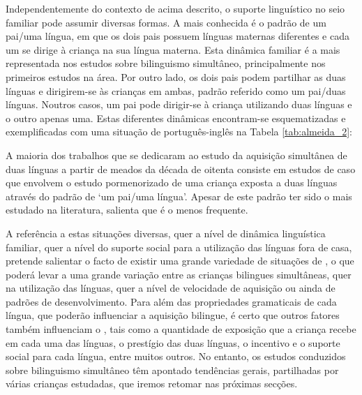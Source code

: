 \documentclass[output=paper]{LSP/langsci}
\begin{document}
Independentemente do contexto de  acima descrito, o suporte linguístico no seio familiar pode assumir diversas formas. A mais conhecida é o padrão de um pai/uma língua, em que os dois pais possuem línguas maternas diferentes e cada um se dirige à criança na sua língua materna. Esta dinâmica familiar é a mais representada nos estudos sobre bilinguismo simultâneo, principalmente nos primeiros estudos na área. Por outro lado, os dois pais podem partilhar as duas línguas e dirigirem-se às crianças em ambas, padrão referido como um pai/duas línguas. Noutros casos, um pai pode dirigir-se à criança utilizando duas línguas e o outro apenas uma. Estas diferentes dinâmicas encontram-se esquematizadas e exemplificadas com uma situação de  português-inglês na Tabela \ref{tab:almeida_2}:

\begin{table}[h]
\centering
{}
\caption{Padrões de contacto com as línguas dos pais em situação de bilinguismo}
\label{tab:almeida_2}
\end{table}

A maioria dos trabalhos que se dedicaram ao estudo da aquisição simultânea de duas línguas a partir de meados da década de oitenta consiste em estudos de caso que envolvem o estudo pormenorizado de uma criança exposta a duas línguas através do padrão de `um pai/uma língua'. Apesar de este padrão ter sido o mais estudado na literatura, \citet{dehouwer2009} salienta que é o menos frequente.

A referência a estas situações diversas, quer a nível de dinâmica linguística familiar, quer a nível do suporte social para a utilização das línguas fora de casa, pretende salientar o facto de existir uma grande variedade de situações de , o que poderá levar a uma grande variação entre as crianças bilingues simultâneas, quer na utilização das línguas, quer a nível de velocidade de aquisição ou ainda de padrões de desenvolvimento. Para além das propriedades gramaticais de cada língua, que poderão influenciar a aquisição bilingue, é certo que outros fatores também influenciam o , tais como a quantidade de exposição que a criança recebe em cada uma das línguas, o prestígio das duas línguas, o incentivo e o suporte social para cada língua, entre muitos outros. No entanto, os estudos conduzidos sobre bilinguismo simultâneo  têm apontado tendências gerais, partilhadas por várias crianças estudadas, que iremos retomar nas próximas secções. 
\end{document}
